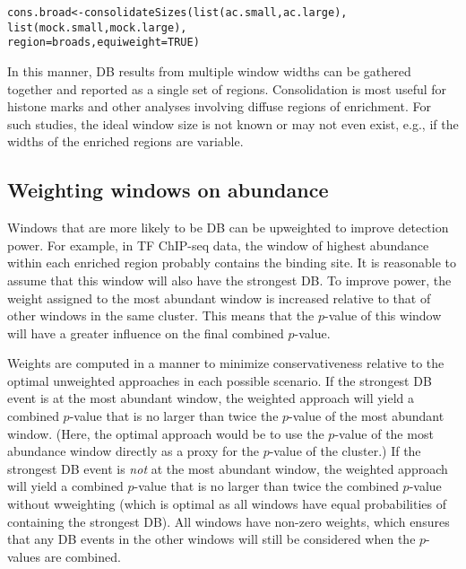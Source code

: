 \documentclass{report}\usepackage[]{graphicx}\usepackage[usenames,dvipsnames]{color}
\newcommand{\hlnum}[1]{\textcolor[rgb]{0.816,0.125,0.439}{#1}}%
\newcommand{\hlstd}[1]{\textcolor[rgb]{0.251,0.251,0.251}{#1}}%
\newcommand{\hlkwb}[1]{\textcolor[rgb]{0,0,0}{#1}}%
\newcommand{\hlkwc}[1]{\textcolor[rgb]{0.251,0.251,0.251}{#1}}%
\newcommand{\hlkwd}[1]{\textcolor[rgb]{0.878,0.439,0.125}{#1}}%
\newenvironment{knitrout}{}{} %
\begin{document}
\begin{knitrout}
\color{fgcolor}\begin{kframe}
\begin{alltt}
\hlstd{cons.broad} \hlkwb{<-} \hlkwd{consolidateSizes}\hlstd{(}\hlkwd{list}\hlstd{(ac.small, ac.large),}
                               \hlkwd{list}\hlstd{(mock.small, mock.large),}
                               \hlkwc{region}\hlstd{=broads,} \hlkwc{equiweight}\hlstd{=}\hlnum{TRUE}\hlstd{)}
\end{alltt}
\end{kframe}
\end{knitrout}

In this manner, DB results from multiple window widths can be gathered together and reported as a single set of regions.
Consolidation is most useful for histone marks and other analyses involving diffuse regions of enrichment.
For such studies, the ideal window size is not known or may not even exist, e.g., if the widths of the enriched regions are variable.

\subsection{Weighting windows on abundance}
Windows that are more likely to be DB can be upweighted to improve detection power.
For example, in TF ChIP-seq data, the window of highest abundance within each enriched region probably contains the binding site.
It is reasonable to assume that this window will also have the strongest DB.
To improve power, the weight assigned to the most abundant window is increased relative to that of other windows in the same cluster.
This means that the $p$-value of this window will have a greater influence on the final combined $p$-value.

Weights are computed in a manner to minimize conservativeness relative to the optimal unweighted approaches in each possible scenario. 
If the strongest DB event is at the most abundant window, the weighted approach will yield a combined $p$-value that is no larger than twice the $p$-value of the most abundant window.
(Here, the optimal approach would be to use the $p$-value of the most abundance window directly as a proxy for the $p$-value of the cluster.)
If the strongest DB event is \emph{not} at the most abundant window, the weighted approach will yield a combined $p$-value that is no larger than twice the combined $p$-value without wweighting (which is optimal as all windows have equal probabilities of containing the strongest DB).
All windows have non-zero weights, which ensures that any DB events in the other windows will still be considered when the $p$-values are combined.
\end{document}
